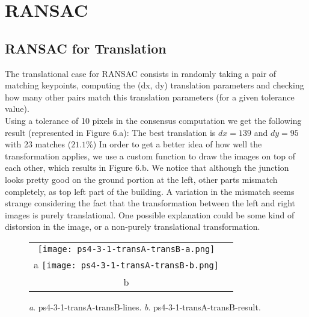 \documentclass[a4paper,11pt]{article}
\begin{document}
\lstset{style=mystyle}



\section{RANSAC}

\subsection{RANSAC for Translation}

The translational case for RANSAC consists in randomly taking a pair of matching keypoints, computing the (dx, dy) translation parameters and checking how many other pairs match this translation parameters (for a given tolerance value).\\
Using a tolerance of 10 pixels in the consensus computation we get the following result (represented in Figure 6.a):
The best translation is $dx = 139$ and $dy = 95$ with 23 matches ($21.1\%$)
In order to get a better idea of how well the transformation applies, we use a custom function to draw the images on top of each other, which results in Figure 6.b.
We notice that although the junction looks pretty good on the ground portion at the left, other parts mismatch completely, as top left part of the building.
A variation in the mismatch seems strange considering the fact that the transformation between the left and right images is purely translational.
One possible explanation could be some kind of distorsion in the image, or a non-purely translational transformation.


 \begin{figure}[H]
\begin{center}
\begin{tabular}{cc}
	\texttt{[image: ps4-3-1-transA-transB-a.png]}\\
	a
	\texttt{[image: ps4-3-1-transA-transB-b.png]}\\
	b
\end{tabular}
\end{center}
\caption{ 
\textit{a}. ps4-3-1-transA-transB-lines.  \textit{b}. ps4-3-1-transA-transB-result.  }
\label{ps-4-3-1}
\end{figure}


\lstset{style=mystyle}

\end{document}
